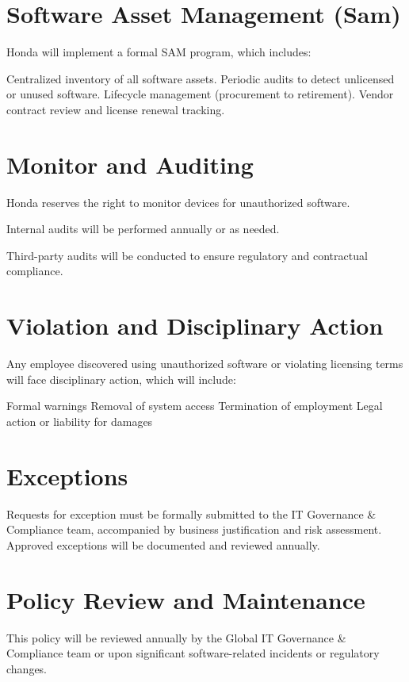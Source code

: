 \section{Software Asset Management (Sam)}
Honda will implement a formal SAM program, which includes:

    Centralized inventory of all software assets.
    Periodic audits to detect unlicensed or unused software.
    Lifecycle management (procurement to retirement).
    Vendor contract review and license renewal tracking.
    
\section{Monitor and Auditing}

Honda reserves the right to monitor devices for unauthorized software.

Internal audits will be performed annually or as needed.

Third-party audits will be conducted to ensure regulatory and contractual compliance.

\section{Violation and Disciplinary Action}

Any employee discovered using unauthorized software or violating licensing terms will face disciplinary action, which will include:
    
    Formal warnings
    Removal of system access
    Termination of employment
    Legal action or liability for damages

\section{Exceptions}

Requests for exception must be formally submitted to the IT Governance \& Compliance team, accompanied by business justification and risk assessment. Approved exceptions will be documented and reviewed annually.

\section{Policy Review and Maintenance}

This policy will be reviewed annually by the Global IT Governance \& Compliance team or upon significant software-related incidents or regulatory changes.
